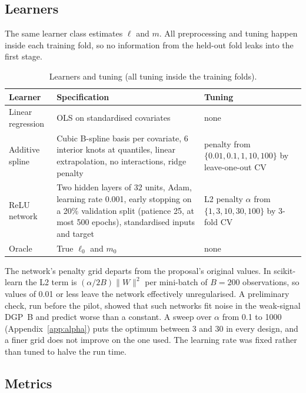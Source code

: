 \documentclass[11pt,a4paper]{article}
\begin{document}
\subsection{Learners}

The same learner class estimates $\ell$ and $m$. All preprocessing and tuning happen inside each training fold, so no information from the held-out fold leaks into the first stage.

\begin{table}[h]
\centering\small
\caption*{Learners and tuning (all tuning inside the training folds).}
\begin{tabularx}{\textwidth}{>{\raggedright\arraybackslash}p{2.6cm}>{\raggedright\arraybackslash}X>{\raggedright\arraybackslash}p{4.2cm}}
\toprule
Learner & Specification & Tuning\\
\midrule
Linear regression & OLS on standardised covariates & none\\
Additive spline & Cubic B-spline basis per covariate, 6 interior knots at quantiles, linear extrapolation, no interactions, ridge penalty & penalty from $\{0.01,0.1,1,10,100\}$ by leave-one-out CV\\
ReLU network & Two hidden layers of 32 units, Adam, learning rate 0.001, early stopping on a 20\% validation split (patience 25, at most 500 epochs), standardised inputs and target & L2 penalty $\alpha$ from $\{1,3,10,30,100\}$ by 3-fold CV\\
Oracle & True $\ell_0$ and $m_0$ & none\\
\bottomrule
\end{tabularx}
\end{table}

The network's penalty grid departs from the proposal's original values. In scikit-learn the L2 term is $(\alpha/2B)\|W\|^2$ per mini-batch of $B=200$ observations, so values of 0.01 or less leave the network effectively unregularised. A preliminary check, run before the pilot, showed that such networks fit noise in the weak-signal DGP~B and predict worse than a constant. A sweep over $\alpha$ from 0.1 to 1000 (Appendix~\ref{app:alpha}) puts the optimum between 3 and 30 in every design, and a finer grid does not improve on the one used. The learning rate was fixed rather than tuned to halve the run time.

\subsection{Metrics}
\end{document}
